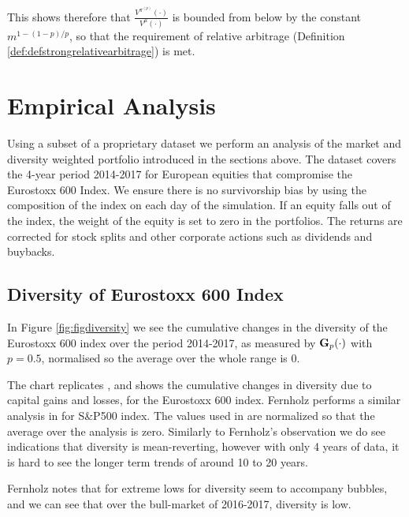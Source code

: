 \documentclass[british]{amsart} \usepackage{lmodern}
\numberwithin{equation}{section} \numberwithin{figure}{section}
\theoremstyle{plain} \newtheorem{thm}{\protect\theoremname}[section]
\theoremstyle{definition} \newtheorem{defn}[thm]{\protect\definitionname}
\theoremstyle{plain} \newtheorem{assumption}[thm]{\protect\assumptionname}
\theoremstyle{plain} \newtheorem{lem}[thm]{\protect\lemmaname}
\theoremstyle{plain} \newtheorem{prop}[thm]{\protect\propositionname}
\theoremstyle{remark} \newtheorem{rem}[thm]{\protect\remarkname}
\theoremstyle{plain} \newtheorem{cor}[thm]{\protect\corollaryname}
\begin{document}
This shows therefore that $\frac{V^{\pi^{(p)}}(\cdot)}{V^{\mu}(\cdot)}$ is
bounded from below by the constant $m^{1-(1-p)/p}$, so that the requirement of
relative arbitrage (Definition \ref{def:defstrongrelativearbitrage}) is met.
\newpage
\section{Empirical Analysis}


Using a subset of a proprietary dataset we perform an analysis of the market and
diversity weighted portfolio introduced in the sections above. The dataset
covers the 4-year period 2014-2017 for European equities that compromise the
Eurostoxx 600 Index. We ensure there is no survivorship bias by using the
composition of the index on each day of the simulation. If an equity falls out
of the index, the weight of the equity is set to zero in the portfolios. The
returns are corrected for stock splits and other corporate actions such as
dividends and buybacks.

\subsection{Diversity of Eurostoxx 600 Index}

In Figure \ref{fig:figdiversity} we see the cumulative changes in the diversity
of the Eurostoxx 600 index over the period 2014-2017, as measured by
$\mathbf{G}_{p}(\cdot)$ with $p=0.5$, normalised so the average over the whole range is 0.

The chart replicates \cite[Figure 1]{fernholz2009}, and shows the cumulative 
changes in diversity due to capital gains and losses, for the Eurostoxx 600
index. Fernholz performs a similar analysis in \cite[Chapter 7]{fernholz2002}
for S\&P500 index. The values used in are normalized so that the average over the analysis
is zero. Similarly to Fernholz's observation we do see indications that 
diversity is mean-reverting, however with only 4 years of data, it is hard to
see the longer term trends of around 10 to 20 years. 

Fernholz \cite{fernholz2009} notes that for extreme lows for diversity seem to
accompany bubbles, and we can see that over the bull-market of 2016-2017,
diversity is low.
\end{document}
